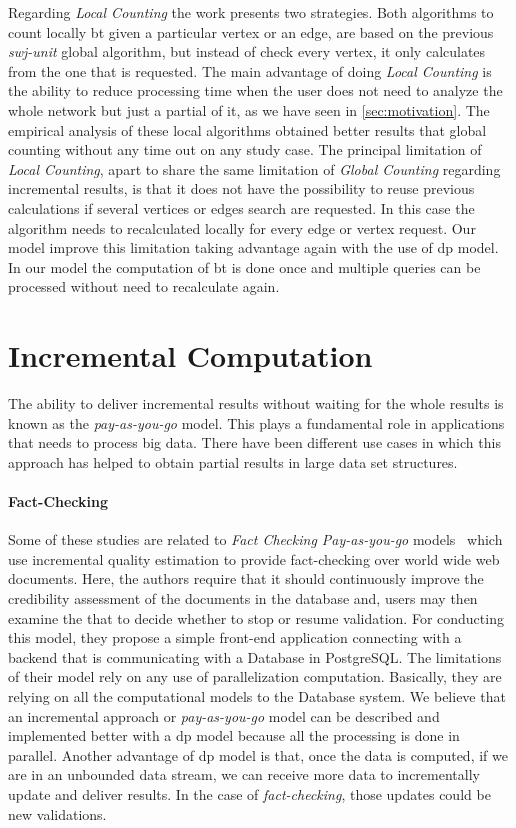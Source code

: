 Regarding \emph{Local Counting} the work presents two strategies. 
Both algorithms to count locally \acrshort{bt} given a particular vertex or an edge, are based on the previous \emph{swj-unit} global algorithm, but instead of check every vertex, it only calculates from the one that is requested. 
The main advantage of doing \emph{Local Counting} is the ability to reduce processing time when the user does not need to analyze the whole network but just a partial of it, as we have seen in \autoref{sec:motivation}.
The empirical analysis of these local algorithms obtained better results that global counting without any time out on any study case.
The principal limitation of \emph{Local Counting}, apart to share the same limitation of \emph{Global Counting} regarding incremental results, is that it does not have the possibility to reuse previous calculations if 
several vertices or edges search are requested. In this case the algorithm needs to recalculated locally for every edge or vertex request.
Our model improve this limitation taking advantage again with the use of \acrshort{dp} model. In our model the computation of \acrshort{bt} is done once and multiple queries can be processed without need to recalculate again.

\section{Incremental Computation}
The ability to deliver incremental results without waiting for the whole results is known as the \emph{pay-as-you-go} model. This plays a fundamental role in applications that needs to process big data. 
There have been different use cases in which this approach has helped to obtain partial results in large data set structures.

\paragraph{Fact-Checking} Some of these studies are related to \emph{Fact Checking Pay-as-you-go} models~\cite{factcatch} which use incremental quality estimation to provide fact-checking over world wide web documents.
Here, the authors require that it should continuously improve the credibility assessment of the documents in the database and, users may then examine the
that to decide whether to stop or resume validation.
For conducting this model, they propose a simple front-end application connecting with a backend that is communicating with a Database in PostgreSQL. 
The limitations of their model rely on any use of parallelization computation. Basically, they are relying on all the computational models to the Database system. 
We believe that an incremental approach or \emph{pay-as-you-go} model can be described and implemented better with a \acrshort{dp} model because all the processing is done in parallel. 
Another advantage of \acrshort{dp} model is that, once the data is computed, if we are in an unbounded data stream, we can receive more data to incrementally update and deliver results. 
In the case of \emph{fact-checking}, those updates could be new validations.

